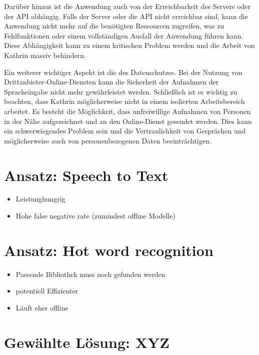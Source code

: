 Darüber hinaus ist die Anwendung auch von der Erreichbarkeit des Servers oder der API abhängig. Falls der Server oder die API nicht erreichbar sind, kann die Anwendung nicht mehr auf die benötigten Ressourcen zugreifen, was zu Fehlfunktionen oder einem vollständigen Ausfall der Anwendung führen kann. Diese Abhängigkeit kann zu einem kritischen Problem werden und die Arbeit von Kathrin massiv behindern.

Ein weiterer wichtiger Aspekt ist die des Datenschutzes. Bei der Nutzung von Drittanbieter-Online-Diensten kann die Sicherheit der Aufnahmen der Spracheingabe nicht mehr gewährleistet werden. Schließlich ist es wichtig zu beachten, dass Kathrin möglicherweise nicht in einem isolierten Arbeitsbereich arbeitet. Es besteht die Möglichkeit, dass unfreiwillige Aufnahmen von Personen in der Nähe aufgezeichnet und an den Online-Dienst gesendet werden. Dies kann ein schwerwiegendes Problem sein und die Vertraulichkeit von Gesprächen und möglicherweise auch von personenbezogenen Daten beeinträchtigen.

\section{Ansatz: Speech to Text}

\begin{itemize}
    \item Leistunghungrig
    \item Hohe false negative rate (zumindest offline Modelle)
\end{itemize}

\section{Ansatz: Hot word recognition}

\begin{itemize}
    \item Passende Bibliothek muss noch gefunden werden
    \item potentiell Effizienter
    \item Läuft eher offline
\end{itemize}

\section{Gewählte Lösung: XYZ}